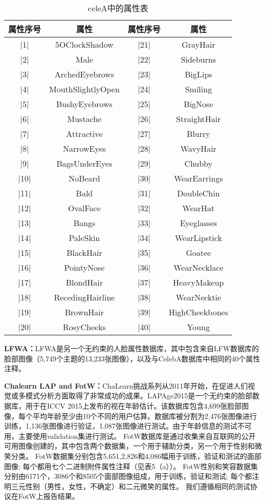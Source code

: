  \begin{table}
  \centering
   \caption{celeA中的属性表}
   \label{tab:req-pkg}
   \begin{tabular}{c|c|c|c}
     \toprule
     属性序号 & 属性 &属性序号 & 属性 \\
     \midrule
     |1|  & 5OClockShadow		 & |21| & GrayHair \\
     |2|  & Male 				 		 & |22| & Sideburns \\
     |3|  & ArchedEyebrows  	 & |23| & BigLips \\
     |4|  & MouthSlightlyOpen  & |24| & Smiling \\
     |5|  & BushyEyebrows  		 & |25| & BigNose \\
     |6|  & Mustache           & |26| & StraightHair \\
     |7|  & Attractive         & |27| & Blurry\\   
     |8|  & NarrowEyes 			 & |28| & WavyHair \\
     |9|  & BagsUnderEyes  		 & |29| & Chubby \\  
     |10| & NoBeard            & |30| & WearEarrings\\   
     |11| & Bald               & |31| & DoubleChin  \\
     |12| & OvalFace           & |32| & WearHat \\
     |13| & Bangs              & |33| & Eyeglasses \\
     |14| & PaleSkin           & |34| & WearLipstick \\
     |15| & BlackHair          & |35| & Goatee \\
     |16| & PointyNose         & |36| & WearNecklace \\
     |17| & BlondHair          & |37| & HeavyMakeup\\
     |18| & RecedingHairline 	 & |38| & WearNecktie\\
     |19| & BrownHair          & |39| & HighCheekbones\\
     |20| & RosyCheeks 			 & |40| & Young\\
     \bottomrule
   \end{tabular}
 \end{table}

\textbf{LFWA：}LFWA是另一个无约束的人脸属性数据库，其中包含来自LFW数据库的脸部图像（5,749个主题的13,233张图像），以及与CelebA数据库中相同的40个属性注释。

\textbf{Chalearn LAP and FotW：}ChaLearn挑战系列从2011年开始，在促进人们视觉或多模式分析方面取得了非常成功的成果。LAPAge2015是一个无约束的脸部数据库，用于在ICCV 2015上发布的视在年龄估计。该数据库包含4,699张脸部图像，每个平均年龄至少由10个不同的用户估算。数据库被分割为2,476张图像进行训练，1,136张图像进行验证，1,087张图像进行测试。由于年龄信息的测试不可用，主要使用validation集进行测试。 FotW数据库是通过收集来自互联网的公开可用图像创建的，其中包含两个数据集，一个用于辅助分类，另一个用于性别和微笑分类。 FotW数据集分别包含5,651,2,826和4,086幅用于训练，验证和测试的面部图像; 每个都用七个二进制附件属性注释（见表5（a））。 FotW性别和笑容数据集分别由6171个，3086个和8505个面部图像组成，用于训练，验证和测试; 每个都注明三元性别（男性，女性，不确定）和二元微笑的属性。 我们遵循相同的测试协议在FotW上报告结果。

